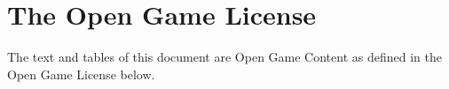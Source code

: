 \chapter{The Open Game License}
\label{Open Game License}

The text and tables of this document are Open Game Content as defined in the Open Game License below.



